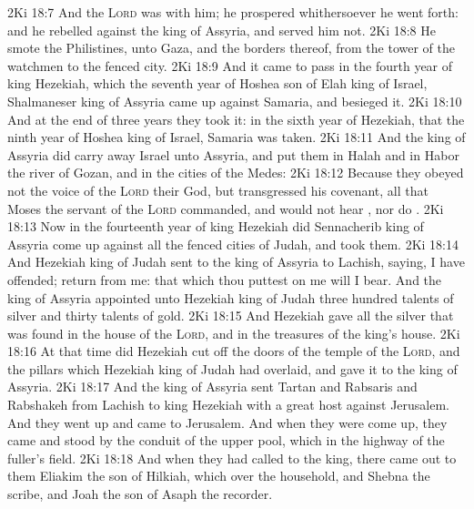 \vs 2Ki 18:7 And the \textsc{Lord} was with him;  he prospered whithersoever he went forth: and he rebelled against the king of Assyria, and served him not.
\vs 2Ki 18:8 He smote the Philistines,  unto Gaza, and the borders thereof, from the tower of the watchmen to the fenced city.
\vs 2Ki 18:9 And it came to pass in the fourth year of king Hezekiah, which  the seventh year of Hoshea son of Elah king of Israel,  Shalmaneser king of Assyria came up against Samaria, and besieged it.
\vs 2Ki 18:10 And at the end of three years they took it:  in the sixth year of Hezekiah, that  the ninth year of Hoshea king of Israel, Samaria was taken.
\vs 2Ki 18:11 And the king of Assyria did carry away Israel unto Assyria, and put them in Halah and in Habor  the river of Gozan, and in the cities of the Medes:
\vs 2Ki 18:12 Because they obeyed not the voice of the \textsc{Lord} their God, but transgressed his covenant,  all that Moses the servant of the \textsc{Lord} commanded, and would not hear , nor do .
\vs 2Ki 18:13 Now in the fourteenth year of king Hezekiah did Sennacherib king of Assyria come up against all the fenced cities of Judah, and took them.
\vs 2Ki 18:14 And Hezekiah king of Judah sent to the king of Assyria to Lachish, saying, I have offended; return from me: that which thou puttest on me will I bear. And the king of Assyria appointed unto Hezekiah king of Judah three hundred talents of silver and thirty talents of gold.
\vs 2Ki 18:15 And Hezekiah gave  all the silver that was found in the house of the \textsc{Lord}, and in the treasures of the king's house.
\vs 2Ki 18:16 At that time did Hezekiah cut off  the doors of the temple of the \textsc{Lord}, and  the pillars which Hezekiah king of Judah had overlaid, and gave it to the king of Assyria.
\vs 2Ki 18:17 And the king of Assyria sent Tartan and Rabsaris and Rabshakeh from Lachish to king Hezekiah with a great host against Jerusalem. And they went up and came to Jerusalem. And when they were come up, they came and stood by the conduit of the upper pool, which  in the highway of the fuller's field.
\vs 2Ki 18:18 And when they had called to the king, there came out to them Eliakim the son of Hilkiah, which  over the household, and Shebna the scribe, and Joah the son of Asaph the recorder.
